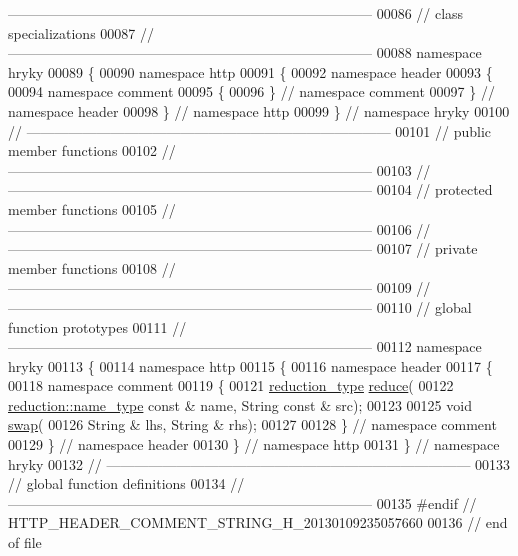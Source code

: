 \begin{DoxyCode}
{      ------------------------------------------------------------------------------}
00086 \textcolor{comment}{// class specializations}
00087 \textcolor{comment}{//
      ------------------------------------------------------------------------------}
00088 \textcolor{keyword}{namespace }hryky
00089 \{
00090 \textcolor{keyword}{namespace }http
00091 \{
00092 \textcolor{keyword}{namespace }header
00093 \{
00094 \textcolor{keyword}{namespace }comment
00095 \{
00096 \} \textcolor{comment}{// namespace comment}
00097 \} \textcolor{comment}{// namespace header}
00098 \} \textcolor{comment}{// namespace http}
00099 \} \textcolor{comment}{// namespace hryky}
00100 \textcolor{comment}{//
      ------------------------------------------------------------------------------}
00101 \textcolor{comment}{// public member functions}
00102 \textcolor{comment}{//
      ------------------------------------------------------------------------------}
00103 \textcolor{comment}{//
      ------------------------------------------------------------------------------}
00104 \textcolor{comment}{// protected member functions}
00105 \textcolor{comment}{//
      ------------------------------------------------------------------------------}
00106 \textcolor{comment}{//
      ------------------------------------------------------------------------------}
00107 \textcolor{comment}{// private member functions}
00108 \textcolor{comment}{//
      ------------------------------------------------------------------------------}
00109 \textcolor{comment}{//
      ------------------------------------------------------------------------------}
00110 \textcolor{comment}{// global function prototypes}
00111 \textcolor{comment}{//
      ------------------------------------------------------------------------------}
00112 \textcolor{keyword}{namespace }hryky
00113 \{
00114 \textcolor{keyword}{namespace }http
00115 \{
00116 \textcolor{keyword}{namespace }header
00117 \{
00118 \textcolor{keyword}{namespace }comment
00119 \{
00121     \hyperlink{namespacehryky_a343a9a4c36a586be5c2693156200eadc}{reduction_type} \hyperlink{namespacehryky_1_1http_a08fc36a78a8e2908140fcd102829a566}{reduce}(
00122         \hyperlink{namespacehryky_1_1reduction_ac686c30a4c8d196bbd0f05629a6b921f}{reduction::name_type} \textcolor{keyword}{const} & name, String \textcolor{keyword}{const} & src);
00123 
00125     \textcolor{keywordtype}{void} \hyperlink{namespacehryky_1_1http_a38e62595ad532d18fbc65ceb61973aec}{swap}(
00126         String & lhs, String & rhs);
00127 
00128 \} \textcolor{comment}{// namespace comment}
00129 \} \textcolor{comment}{// namespace header}
00130 \} \textcolor{comment}{// namespace http}
00131 \} \textcolor{comment}{// namespace hryky}
00132 \textcolor{comment}{//
      ------------------------------------------------------------------------------}
00133 \textcolor{comment}{// global function definitions}
00134 \textcolor{comment}{//
      ------------------------------------------------------------------------------}
00135 \textcolor{preprocessor}{#endif // HTTP\_HEADER\_COMMENT\_STRING\_H\_20130109235057660}
00136 \textcolor{preprocessor}{}\textcolor{comment}{// end of file}
\end{DoxyCode}

